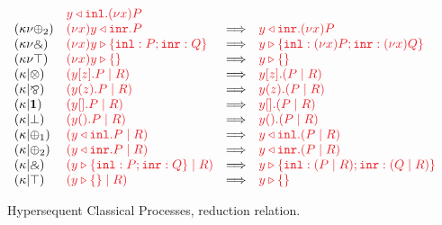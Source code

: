 \documentclass[draft,submission,copyright,creativecommons]{eptcs}
\begin{document}
\begin{figure}[htb]
\[\begin{array}{llcll}
      & \tm{\cpInl{y}{\piNew{x}{P}}}
      \\
      \hccpRedKappaNuPlus2
      & \tm{\piNew{x}{\cpInr{y}{P}}}
      & \Longrightarrow
      & \tm{\cpInr{y}{\piNew{x}{P}}}
      \\
      \hccpRedKappaNuWith
      & \tm{\piNew{x}{\cpCase{y}{P}{Q}}}
      & \Longrightarrow
      & \tm{\cpCase{y}{\piNew{x}{P}}{\piNew{x}{Q}}}
      \\
      \hccpRedKappaNuTop
      & \tm{\piNew{x}{\cpAbsurd{y}}}
      & \Longrightarrow
      & \tm{\cpAbsurd{y}}
      \\
      \hccpRedKappaMixTens
      & \tm{(\piPar{\piBoundSend{y}{z}{P}}{R})}
      & \Longrightarrow
      & \tm{\piBoundSend{y}{z}{(\piPar{P}{R})}}
      \\
      \hccpRedKappaMixParr
      & \tm{(\piPar{\piRecv{y}{z}{P}}{R})}
      & \Longrightarrow
      & \tm{\piRecv{y}{z}{(\piPar{P}{R})}}
      \\
      \hccpRedKappaMixOne
      & \tm{(\piPar{\piBoundSend{y}{}{P}}{R})}
      & \Longrightarrow
      & \tm{\piBoundSend{y}{}{(\piPar{P}{R})}}
      \\
      \hccpRedKappaMixBot
      & \tm{(\piPar{\piRecv{y}{}{P}}{R})}
      & \Longrightarrow
      & \tm{\piRecv{y}{}{(\piPar{P}{R})}}
      \\
      \hccpRedKappaMixPlus1
      & \tm{(\piPar{\cpInl{y}{P}}{R})}
      & \Longrightarrow
      & \tm{\cpInl{y}{(\piPar{P}{R})}}
      \\
      \hccpRedKappaMixPlus2
      & \tm{(\piPar{\cpInr{y}{P}}{R})}
      & \Longrightarrow
      & \tm{\cpInr{y}{(\piPar{P}{R})}}
      \\
      \hccpRedKappaMixWith
      & \tm{(\piPar{\cpCase{y}{P}{Q}}{R})}
      & \Longrightarrow
      & \tm{\cpCase{y}{(\piPar{P}{R})}{(\piPar{Q}{R})}}
      \\
      \hccpRedKappaMixTop
      & \tm{(\piPar{\cpAbsurd{y}}{R})}
      & \Longrightarrow
      & \tm{\cpAbsurd{y}}
    \end{array}
  \]
  \begin{center}
    \begin{prooftree*}
      \SYM{\hccpRedGammaNew}
    \end{prooftree*}
    \begin{prooftree*}
      \SYM{\hccpRedGammaMix}
    \end{prooftree*}
    \begin{prooftree*}
      \SYM{\hccpRedGammaEquiv}
    \end{prooftree*}
  \end{center}
  \caption{Hypersequent Classical Processes, reduction relation.}
  \label{fig:hcp-reduction}
\end{figure}
\end{document}
